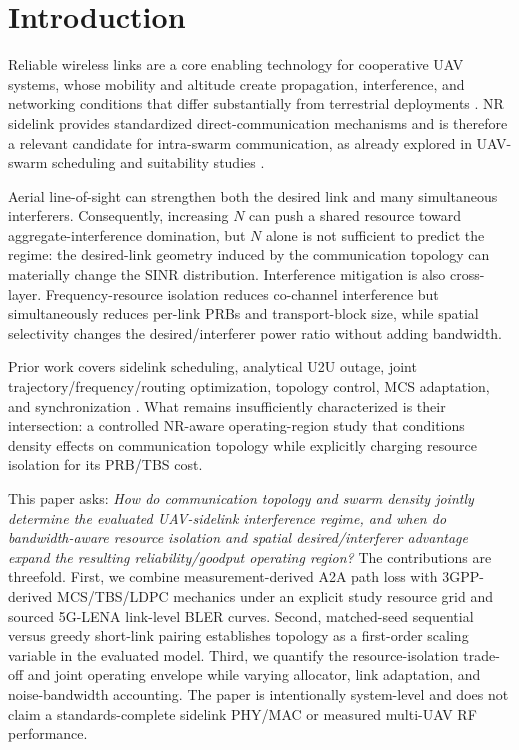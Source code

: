 \section{Introduction}
Reliable wireless links are a core enabling technology for cooperative UAV systems, whose mobility and altitude create propagation, interference, and networking conditions that differ substantially from terrestrial deployments \cite{zeng2019sky,mozaffari2019tutorial}. NR sidelink provides standardized direct-communication mechanisms \cite{garcia2021nrv2x} and is therefore a relevant candidate for intra-swarm communication, as already explored in UAV-swarm scheduling and suitability studies \cite{mishra2022cu2x,varonen2024sidelink}.

Aerial line-of-sight can strengthen both the desired link and many simultaneous interferers. Consequently, increasing $N$ can push a shared resource toward aggregate-interference domination, but $N$ alone is not sufficient to predict the regime: the desired-link geometry induced by the communication topology can materially change the SINR distribution. Interference mitigation is also cross-layer. Frequency-resource isolation reduces co-channel interference but simultaneously reduces per-link PRBs and transport-block size, while spatial selectivity changes the desired/interferer power ratio without adding bandwidth.

Prior work covers sidelink scheduling, analytical U2U outage, joint trajectory/frequency/routing optimization, topology control, MCS adaptation, and synchronization \cite{lau2023outage,alam2024jtfr,bai2026topology,yu2025uavlink,zhang2026sync}. What remains insufficiently characterized is their intersection: a controlled NR-aware operating-region study that conditions density effects on communication topology while explicitly charging resource isolation for its PRB/TBS cost.

This paper asks: \emph{How do communication topology and swarm density jointly determine the evaluated UAV-sidelink interference regime, and when do bandwidth-aware resource isolation and spatial desired/interferer advantage expand the resulting reliability/goodput operating region?} The contributions are threefold. First, we combine measurement-derived A2A path loss with 3GPP-derived MCS/TBS/LDPC mechanics under an explicit study resource grid and sourced 5G-LENA link-level BLER curves. Second, matched-seed sequential versus greedy short-link pairing establishes topology as a first-order scaling variable in the evaluated model. Third, we quantify the resource-isolation trade-off and joint operating envelope while varying allocator, link adaptation, and noise-bandwidth accounting. The paper is intentionally system-level and does not claim a standards-complete sidelink PHY/MAC or measured multi-UAV RF performance.

